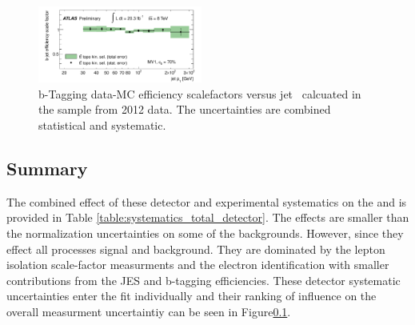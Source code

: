 \begin{figure}[htbp]
\begin{center}
\includegraphics[width=0.48\textwidth]{figs/systematics/ttbartopo}
\caption{b-Tagging data-MC efficiency scalefactors versus jet \pt\ calcuated in the \ttbar sample from 2012 data. The uncertainties are combined statistical and systematic.} 
\label{figure:systematics_b}
\end{center}
\end{figure}


\subsection{Summary}

The combined effect of these detector and experimental systematics on the \ttV and \tth is provided in Table \ref{table:systematics_total_detector}. The effects are smaller than the normalization uncertainties on some of the backgrounds. However, since they effect all processes signal and background. They are dominated by the lepton isolation scale-factor measurments and the electron identification with smaller contributions from the JES and b-tagging efficiencies. These detector systematic uncertainties enter the fit individually and their ranking of influence on the overall measurment uncertaintiy can be seen in Figure\ref{}.

